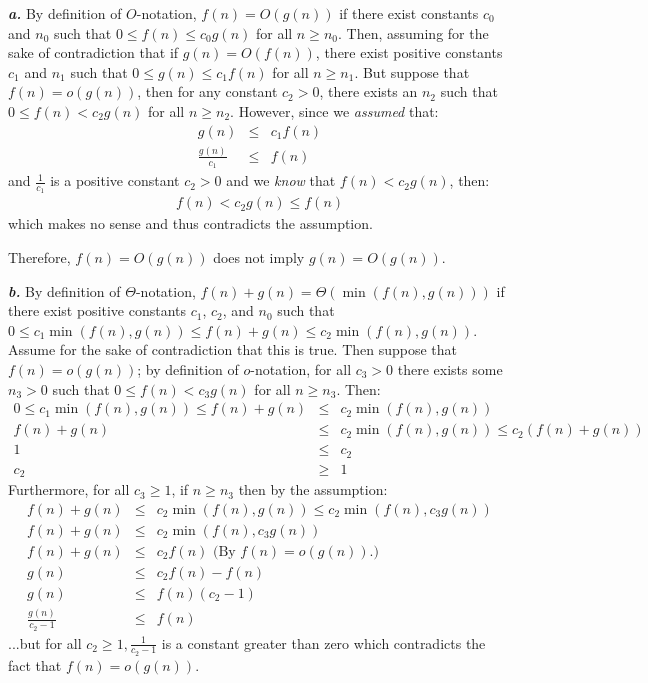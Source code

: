 \noindent\textbf{\textit{a.}} By definition of $O$-notation, $f(n) = O(g(n))$ if there exist constants $c_0$ and $n_0$ such that $0 \leq f(n) \leq c_0 g(n)$ for all $n \geq n_0$. Then, assuming for the sake of contradiction that if $g(n) = O(f(n))$, there exist positive constants $c_1$ and $n_1$ such that $0 \leq g(n) \leq c_1 f(n)$ for all $n \geq n_1$. But suppose that $f(n) = o(g(n))$, then for any constant $c_2 > 0$, there exists an $n_2$ such that $0 \leq f(n) < c_2 g(n)$ for all $n \geq n_2$. However, since we \textit{assumed} that:
\begin{eqnarray*}
	g(n) & \leq & c_1 f(n) \\
	\frac{g(n)}{c_1} & \leq & f(n)
\end{eqnarray*}
and $\frac{1}{c_1}$ is a positive constant $c_2 > 0$ and we \textit{know} that $f(n) < c_2 g(n)$, then:
\begin{eqnarray*}
	f(n) < c_2 g(n) \leq f(n)
\end{eqnarray*}
which makes no sense and thus contradicts the assumption.

Therefore, $f(n) = O(g(n))$ does not imply $g(n) = O(g(n))$.

\noindent\textbf{\textit{b.}} By definition of $\Theta$-notation, $f(n) + g(n) = \Theta(\min(f(n),g(n)))$ if there exist positive constants $c_1$, $c_2$, and $n_0$ such that $0 \leq c_1 \min(f(n),g(n)) \leq f(n) + g(n) \leq c_2 \min(f(n),g(n))$. Assume for the sake of contradiction that this is true. Then suppose that $f(n) = o(g(n))$; by definition of $o$-notation, for all $c_3 > 0$ there exists some $n_3 > 0$ such that $0 \leq f(n) < c_3 g(n)$ for all $n \geq n_3$. Then:
\begin{eqnarray*}
	0 \leq c_1 \min(f(n),g(n)) \leq f(n) + g(n) & \leq & c_2 \min(f(n),g(n)) \\
	f(n) + g(n) & \leq & c_2 \min(f(n),g(n)) \leq c_2 (f(n) + g(n)) \\
	1 & \leq & c_2 \\
	c_2 & \geq & 1
\end{eqnarray*}
Furthermore, for all $c_3 \geq 1$, if $n \geq n_3$ then by the assumption:
\begin{eqnarray*}
	f(n) + g(n) & \leq & c_2 \min(f(n),g(n)) \leq c_2 \min(f(n),c_3 g(n)) \\
	f(n) + g(n) & \leq & c_2 \min(f(n),c_3 g(n)) \\
	f(n) + g(n) & \leq & c_2 f(n) \text{ (By $f(n) = o(g(n))$.)} \\
	g(n) & \leq & c_2 f(n) - f(n) \\
	g(n) & \leq & f(n)(c_2 - 1) \\
	\frac{g(n)}{c_2 - 1} & \leq & f(n)
\end{eqnarray*}
...but for all $c_2 \geq 1, \frac{1}{c_2 - 1}$ is a constant greater than zero which contradicts the fact that $f(n) = o(g(n))$.


